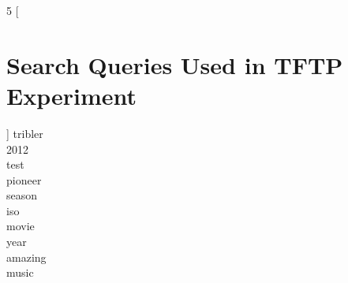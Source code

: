 \begin{multicols}{5}
	[
	\section{Search Queries Used in TFTP Experiment}
	\label{appsec:search-queries-tftp}
	]
	tribler\\
	2012\\
	test\\
	pioneer\\
	season\\
	iso\\
	movie\\
	year\\
	amazing\\
	music
\end{multicols}